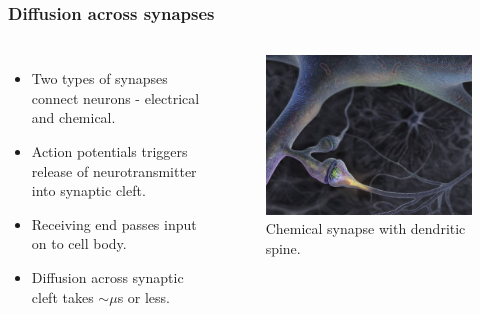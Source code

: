 \begin{frame}
 \frametitle{Diffusion across synapses}
 \begin{columns}
 \begin{itemize}
 \item Two types of synapses connect neurons - electrical and chemical.
 \item Action potentials triggers release of neurotransmitter into synaptic cleft.
 \item Receiving end passes input on to cell body.
 \item Diffusion across synaptic cleft takes $\sim\mu$s or less.
 \end{itemize}
\begin{figure}[H]
 \centering
 \includegraphics[width=\textwidth]{figures/synapse.jpg}
 \caption{Chemical synapse with dendritic spine.}
\end{figure}
 \end{columns} 
\end{frame}

